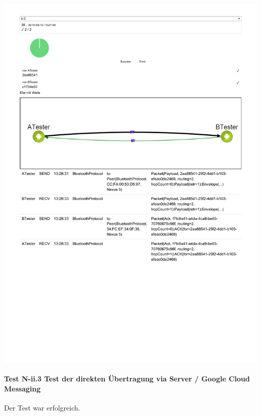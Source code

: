 \includegraphics[trim=0 200 0 0,clip,scale=0.8]{belege/manuelle-tests/netzwerk/Dashboardauszuege/Netzwerktest_n-ii-2b.pdf}
\clearpage

\paragraph{Test N-ii.3 Test der direkten Übertragung via Server / Google Cloud Messaging}

Der Test war erfolgreich.

